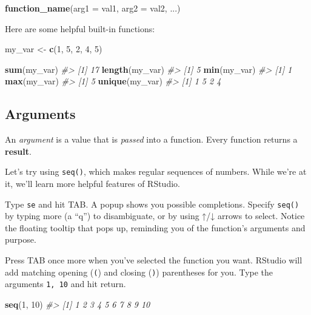 \documentclass[]{book}
\newenvironment{Shaded}{\begin{snugshade}}{\end{snugshade}}
\newcommand{\CommentTok}[1]{\textcolor[rgb]{0.56,0.35,0.01}{\textit{#1}}}
\newcommand{\DataTypeTok}[1]{\textcolor[rgb]{0.13,0.29,0.53}{#1}}
\newcommand{\DecValTok}[1]{\textcolor[rgb]{0.00,0.00,0.81}{#1}}
\newcommand{\KeywordTok}[1]{\textcolor[rgb]{0.13,0.29,0.53}{\textbf{#1}}}
\newcommand{\NormalTok}[1]{#1}
\newcommand{\StringTok}[1]{\textcolor[rgb]{0.31,0.60,0.02}{#1}}
\begin{document}
\begin{Shaded}
\begin{Highlighting}[]
\KeywordTok{function_name}\NormalTok{(}\DataTypeTok{arg1 =}\NormalTok{ val1, }\DataTypeTok{arg2 =}\NormalTok{ val2, ...)}
\end{Highlighting}
\end{Shaded}

Here are some helpful built-in functions:

\begin{Shaded}
\begin{Highlighting}[]
\NormalTok{my_var <-}\StringTok{ }\KeywordTok{c}\NormalTok{(}\DecValTok{1}\NormalTok{, }\DecValTok{5}\NormalTok{, }\DecValTok{2}\NormalTok{, }\DecValTok{4}\NormalTok{, }\DecValTok{5}\NormalTok{)}

\KeywordTok{sum}\NormalTok{(my_var)}
\CommentTok{#> [1] 17}
\KeywordTok{length}\NormalTok{(my_var)}
\CommentTok{#> [1] 5}
\KeywordTok{min}\NormalTok{(my_var)}
\CommentTok{#> [1] 1}
\KeywordTok{max}\NormalTok{(my_var)}
\CommentTok{#> [1] 5}
\KeywordTok{unique}\NormalTok{(my_var)}
\CommentTok{#> [1] 1 5 2 4}
\end{Highlighting}
\end{Shaded}

\hypertarget{arguments}{%
\subsection{Arguments}\label{arguments}}

An \emph{argument} is a value that is \emph{passed} into a function. Every function returns a \textbf{result}.

Let's try using \texttt{seq()}, which makes regular sequences of numbers. While we're at it, we'll learn more helpful features of RStudio.

Type \texttt{se} and hit TAB. A popup shows you possible completions. Specify \texttt{seq()} by typing more (a ``q'') to disambiguate, or by using ↑/↓ arrows to select. Notice the floating tooltip that pops up, reminding you of the function's arguments and purpose.

Press TAB once more when you've selected the function you want. RStudio will add matching opening (\texttt{(}) and closing (\texttt{)}) parentheses for you. Type the arguments \texttt{1,\ 10} and hit return.

\begin{Shaded}
\begin{Highlighting}[]
\KeywordTok{seq}\NormalTok{(}\DecValTok{1}\NormalTok{, }\DecValTok{10}\NormalTok{)}
\CommentTok{#>  [1]  1  2  3  4  5  6  7  8  9 10}
\end{Highlighting}
\end{Shaded}
\end{document}
